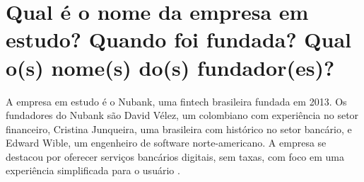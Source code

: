 \section{Qual é o nome da empresa em estudo? Quando foi fundada? Qual o(s) nome(s) do(s) fundador(es)?}

A empresa em estudo é o Nubank, uma fintech brasileira fundada em 2013. Os fundadores do Nubank são David Vélez, um colombiano com experiência no setor financeiro, Cristina Junqueira, uma brasileira com histórico no setor bancário, e Edward Wible, um engenheiro de software norte-americano. A empresa se destacou por oferecer serviços bancários digitais, sem taxas, com foco em uma experiência simplificada para o usuário \cite{nubank2023}.